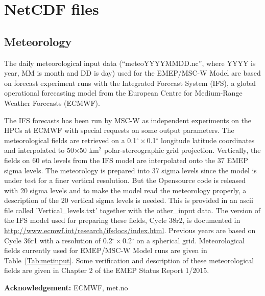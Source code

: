 \section{NetCDF files}



\subsection{Meteorology}
The daily meteorological input data (``meteoYYYYMMDD.nc'', where YYYY is year, MM is month 
and DD is day) used for the EMEP/MSC-W Model are based on
forecast experiment runs with the Integrated Forecast System (IFS), a global
operational forecasting model from the European Centre for Medium-Range
Weather Forecasts (ECMWF).

The IFS forecasts has been run by MSC-W as
independent experiments on the HPCs at ECMWF with special requests on
some output parameters. The meteorological fields are retrieved on a
0.1$^{\circ}\times$0.1$^{\circ}$ longitude latitude coordinates and interpolated to
50$\times$50 km$^2$ polar-stereographic grid projection. Vertically, the fields
on 60 eta levels from the IFS model are interpolated onto the 37 EMEP sigma
levels.  The meteorology is prepared into 37 sigma levels since the model is 
under test for a finer vertical resolution.  But the Opensource code is released
with 20 sigma levels and to make the model read the meteorology properly, 
a description of the 20 vertical sigma levels is needed.  This is provided in 
an ascii file called 'Vertical\_levels.txt' together with the other\_input data. 
The version of the IFS model used for preparing these fields,
Cycle 38r2, is documented in \url{http://www.ecmwf.int/research/ifsdocs/index.html}. Previous years are based on Cycle 36r1 with a resolution of 0.2$^{\circ}\times$0.2$^{\circ}$ on a spherical grid. 
Meteorological fields currently used for EMEP/MSC-W Model runs are given in
Table~\ref{Tab:metinput}. Some verification and description of these
meteorological fields are given in Chapter 2 of the EMEP Status Report
1/2015.

{\bf Acknowledgement:} ECMWF, met.no

